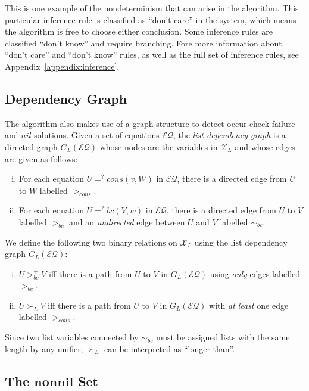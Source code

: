 \documentclass[11pt]{article}
\newcommand{\ueq}{=_{}^?}
\newcommand{\X}{\mathcal{X}}
\newcommand{\EQ}{\mathcal{EQ}}
\newcommand{\Bc}{\mathit{bc}}
\newcommand{\Cons}{\mathit{cons}}
\newcommand{\Nil}{\mathit{nil}}
\newcommand{\Nonnil}{\mathbf{nonnil}}
\begin{document}
This is one example of the nondeterminism that can arise in the algorithm.
This particular inference rule is classified as ``don't care'' in the system,
which means the algorithm is free to choose either conclusion. Some inference
rules are classified ``don't know'' and require branching. Fore more information
about ``don't care'' and ``don't know'' rules, as well as the full set of inference
rules, see Appendix~\ref{appendix:inference}.

\subsection{Dependency Graph}\label{subsection:graph}

The algorithm also makes use of a graph structure to detect occur-check failure
and $\Nil$-solutions. Given a set of equations $\EQ$, the \emph{list dependency
graph} is a directed graph $G_L(\EQ)$ whose nodes are the variables in $\X_L$ and
whose edges are given as follows:
\begin{enumerate}[(i)]
    \item For each equation $U \ueq \Cons(v, W)$ in $\EQ$, there is a directed
        edge from $U$ to $W$ labelled $>_{\Cons}$.
    \item For each equation $U \ueq \Bc(V, w)$ in $\EQ$, there is a directed
        edge from $U$ to $V$ labelled $>_{\Bc}$ and an \emph{undirected} edge
        between $U$ and $V$ labelled $\sim_{\Bc}$.
\end{enumerate}
We define the following two binary relations on $\X_L$ using the list dependency
graph $G_L(\EQ)$:
\begin{enumerate}[(i)]
    \item $U >_{\Bc}^+ V$ iff there is a path from $U$ to $V$ in $G_L(\EQ)$
        using \emph{only} edges labelled $>_{\Bc}$.

    \item $U \succ_L V$ iff there is a path from $U$ to $V$ in $G_L(\EQ)$ with
        \emph{at least} one edge labelled $>_{\Cons}$.
\end{enumerate}
Since two list variables connected by $\sim_{\Bc}$ must be assigned lists with
the same length by any unifier, $\succ_L$ can be interpreted as ``longer than''.

\subsection{The \texorpdfstring{$\Nonnil$}{nonnil} Set}
\label{subsection:nonnil}
\end{document}
